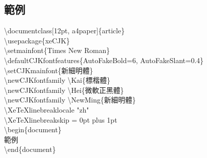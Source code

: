\documentclass[12pt, a4paper]{article}
\begin{document}
\subsection*{範例}
\textbackslash documentclass[12pt, a4paper]\{article\}		\\[1ex]
\textbackslash usepackage\{xeCJK\}	\\
\textbackslash setmainfont\{Times New Roman\}		\\[1ex]
\textbackslash defaultCJKfontfeatures\{AutoFakeBold=6, AutoFakeSlant=0.4\}	\\
\textbackslash setCJKmainfont\{新細明體\}	\\
\textbackslash newCJKfontfamily \textbackslash Kai\{標楷體\}	\\       	
\textbackslash newCJKfontfamily \textbackslash Hei\{微軟正黑體\}	\\  
\textbackslash newCJKfontfamily \textbackslash NewMing\{新細明體\} 	\\
\textbackslash XeTeXlinebreaklocale "zh"            \\
\textbackslash XeTeXlinebreakskip = 0pt plus 1pt  \\[1ex]
\textbackslash begin\{document\}	\\
\hspace*{1em} 範例\\
\textbackslash end\{document\}
\end{document}
